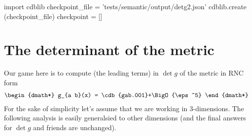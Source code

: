 \documentclass[12pt]{cdblatex}
\begin{document}

\bgroup
{}
\begin{cadabra}
   import cdblib
   checkpoint_file = 'tests/semantic/output/detg2.json'
   cdblib.create (checkpoint_file)
   checkpoint = []
\end{cadabra}
\egroup

\section*{The determinant of the metric}

Our game here is to compute (the leading terms) in $\det g$ of the metric in RNC form
\begin{dgroup*}
   \begin{dmath*} g_{a b}(x) = \cdb{gab.001}+\BigO{\eps^5} \end{dmath*}
\end{dgroup*}
For the sake of simplicity let's assume that we are working in 3-dimensions. The following
analysis is easily generalsied to other dimensions (and the final answers for $\det g$ and
friends are unchanged).
\end{document}
